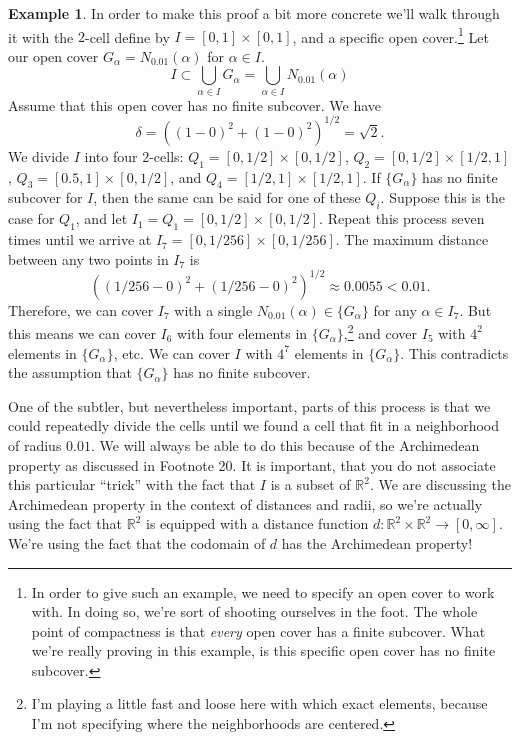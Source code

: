 \documentclass{article}
\newcommand{\R}{\mathbb{R}}
\theoremstyle{definition}
\newtheorem{example}{Example}[section]
\begin{document}
\begin{example}
	In order to make this proof a bit more concrete we'll walk through it with the $ 2 $-cell define by $ I=[0,1]\times[0,1] $, and a specific open cover.\footnote{In order to give such an example, we need to specify an open cover to work with. In doing so, we're sort of shooting ourselves in the foot. The whole point of compactness is that \textit{every} open cover has a finite subcover. What we're really proving in this example, is this specific open cover has no finite subcover.} Let our open cover $ G_\alpha=N_{0.01}(\alpha)  $ for $ \alpha\in I $. $$ I\subset \bigcup_{\alpha\in I} G_\alpha=\bigcup_{\alpha\in I}N_{0.01}(\alpha)$$  Assume that this open cover has no finite subcover. We have $$ \delta=((1-0)^2+(1-0)^2)^{1/2}=\sqrt{2} .$$ We divide $ I $ into four $ 2 $-cells: $ Q_1=[0,1/2]\times[0,1/2] $, $Q_2=[0,1/2]\times[1/2,1]$, $ Q_3=[0.5,1]\times[0,1/2] $, and $ Q_4=[1/2,1]\times[1/2,1] $. If $ \{G_\alpha\} $ has no finite subcover for $ I $, then the same can be said for one of these $ Q_i $. Suppose this is the case for $ Q_1 $, and let $ I_1=Q_1=[0,1/2]\times[0,1/2] $. Repeat this process seven times until we arrive at $ I_7=[0,1/256]\times[0,1/256] $. The maximum distance between any two points in $ I_7 $ is $$ \left((1/256-0)^2+(1/256-0)^2\right)^{1/2}\approx0.0055<0.01.$$ Therefore, we can cover $ I_7 $ with a single $ N_{0.01}(\alpha) \in\{G_\alpha\}$ for any $ \alpha\in I_7 $. But this means we can cover $ I_6 $ with four elements in $ \{G_\alpha\} $,\footnote{I'm playing a little fast and loose here with which exact elements, because I'm not specifying where the neighborhoods are centered.}  and cover $ I_5 $ with $ 4^2 $ elements in $ \{G_\alpha\}  $, etc. We can cover $ I $ with $ 4^7 $ elements in $ \{G_\alpha\} $. This contradicts the assumption that $ \{G_\alpha\} $ has no finite subcover. 
	
	One of the subtler, but nevertheless important, parts of this process is that we could repeatedly divide the cells until we found a cell that fit in a neighborhood of radius $ 0.01 $. We will always be able to do this because of the Archimedean property as discussed in Footnote 20. It is important, that you do not associate this particular ``trick'' with the fact that $ I $ is a subset of $ \R^2 $. We are discussing the Archimedean property in the context of distances and radii, so we're actually using the fact that $ \R^2  $ is equipped with a distance function $ d:\R^2\times\R^2\to[0,\infty] $. We're using the fact that the codomain of $ d $ has the Archimedean property!  
\end{example}
\end{document}
